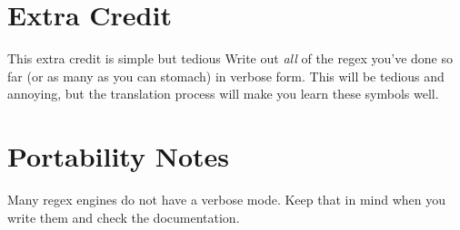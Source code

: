 \section{Extra Credit}

This extra credit is simple but tedious  Write out \emph{all} of the regex you've
done so far (or as many as you can stomach) in verbose form.  This will
be tedious and annoying, but the translation process will make you learn
these symbols well.


\section{Portability Notes}

Many regex engines do not have a verbose mode.  Keep that in mind when you
write them and check the documentation.
